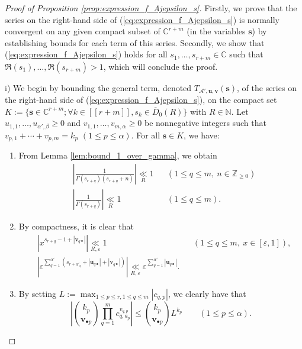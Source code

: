 \documentclass[a4paper]{amsart}
\theoremstyle{remark}
\theoremstyle{definition}
\begin{document}
\begin{proof}[Proof of Proposition \ref{prop:expression_f_Ajepsilon_s}]
Firstly, we prove that the series on the right-hand side of (\ref{eq:expression_f_Ajepsilon_s}) is normally convergent on any given compact subset of $\mathbb{C}^{r+m}$ (in the variables $\mathbf{s}$) by establishing bounds for each term of this series. Secondly, we show that (\ref{eq:expression_f_Ajepsilon_s}) holds for all $s_1,\ldots,s_{r+m} \in \mathbb{C}$ such that $\Re(s_1),\ldots,\Re(s_{r+m})>1$, which will conclude the proof.

i) We begin by bounding the general term, denoted $T_{\mathcal{A}',\mathbf{u},\mathbf{v}}(\mathbf{s})$, of the series on the right-hand side of (\ref{eq:expression_f_Ajepsilon_s}), on the compact set $K:=\{ \mathbf{s} \in \mathbb{C}^{r+m};\forall k \in [\![ r+m ]\!], s_k \in \overline{D}_0(R) \}$ with $R \in \mathbb{N}$. Let $u_{1,1},\ldots,u_{\alpha',\beta} \geq 0$ and $v_{1,1},\ldots,v_{m,\alpha} \geq 0$ be nonnegative integers such that $v_{p,1}+\cdots+v_{p,m}=k_p$ $(1 \leq p \leq \alpha)$. For all $\mathbf{s} \in K$, we have:
\begin{enumerate}
\item[$\bullet$] From Lemma \ref{lem:bound_1_over_gamma}, we obtain
\begin{align}
    & \left|\frac{1}{\Gamma(s_{r+q})(s_{r+q}+n)}\right| \underset{R}{\ll} 1 && (1 \leq q \leq m, \ n \in \mathbb{Z}_{\geq 0}) \label{eq:bound_gamma_inverse_uniform} \\
    & \left| \frac{1}{\Gamma(s_{r+q})} \right| \underset{R}{\ll} 1 && (1 \leq q \leq m). \label{eq:bound_gamma_inverse}
\end{align}

\item[$\bullet$] By compactness, it is clear that
\begin{align}
    &\left|x^{s_{r+q}-1+|\mathbf{v}_{q \bullet}|} \right| \underset{R,\varepsilon}{\ll} 1 && (1 \leq q \leq m, \ x \in [\varepsilon,1]), \label{eq:bound_x_power} \\
    &\left|\varepsilon^{\sum_{q=1}^{\alpha'} (s_{r+a'_q}+|\mathbf{u}_{q \bullet}|+|\mathbf{v}_{q \bullet}|)} \right| \underset{R,\varepsilon}{\ll} \varepsilon^{\sum_{q=1}^{\alpha'} |\mathbf{u}_{q \bullet}|}. \label{eq:bound_epsilon_power}
\end{align}

\item[$\bullet$] By setting $L:= \max_{1 \leq p \leq r, 1 \leq q \leq m} |c_{q,p}|$, we clearly have that 
\begin{equation}
    \left| \binom{k_p}{\mathbf{v}_{\bullet p}} \prod_{q=1}^m c_{q,a_p}^{v_{q,p}} \right| \leq \binom{k_p}{\mathbf{v}_{\bullet p}} L^{k_p} \qquad (1 \leq p \leq \alpha). \label{eq:bound_binomial}
\end{equation}


\end{enumerate}
\end{proof}
\end{document}
